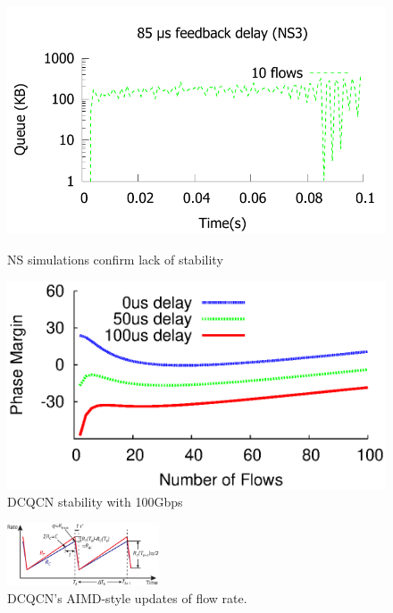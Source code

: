 \begin{figure}[t]
{\begin{minipage}{0.33\textwidth}
\includegraphics[width=0.99\columnwidth]{figures/stable_queue_85_ns.pdf}
\caption{NS simulations confirm lack of stability}
\label{fig:dcqcn_unstable_ns}

\includegraphics[width=0.99\columnwidth]{figures/dcqcn_stability_100gbps.eps}
\caption{DCQCN stability with 100Gbps}
\label{fig:dcqcn_100gbps}
\end{minipage}
}
\end{figure}


\begin{figure}[t]
\center
\includegraphics[width=0.4\textwidth]{figures/dcqcn_convergence.eps}
\caption{DCQCN's AIMD-style updates of flow rate.}
\label{fig:dcqcn_convergence}
\end{figure}


